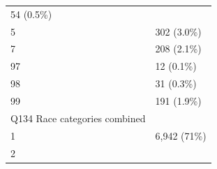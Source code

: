 \documentclass[]{article}
\begin{document}
\begin{longtable}[]{@{}ll@{}}
\begin{minipage}[t]{0.23\columnwidth}
54 (0.5\%)\strut
\end{minipage}\tabularnewline
\begin{minipage}[t]{0.71\columnwidth}\raggedright
5\strut
\end{minipage} & \begin{minipage}[t]{0.23\columnwidth}\raggedright
302 (3.0\%)\strut
\end{minipage}\tabularnewline
\begin{minipage}[t]{0.71\columnwidth}\raggedright
7\strut
\end{minipage} & \begin{minipage}[t]{0.23\columnwidth}\raggedright
208 (2.1\%)\strut
\end{minipage}\tabularnewline
\begin{minipage}[t]{0.71\columnwidth}\raggedright
97\strut
\end{minipage} & \begin{minipage}[t]{0.23\columnwidth}\raggedright
12 (0.1\%)\strut
\end{minipage}\tabularnewline
\begin{minipage}[t]{0.71\columnwidth}\raggedright
98\strut
\end{minipage} & \begin{minipage}[t]{0.23\columnwidth}\raggedright
31 (0.3\%)\strut
\end{minipage}\tabularnewline
\begin{minipage}[t]{0.71\columnwidth}\raggedright
99\strut
\end{minipage} & \begin{minipage}[t]{0.23\columnwidth}\raggedright
191 (1.9\%)\strut
\end{minipage}\tabularnewline
\begin{minipage}[t]{0.71\columnwidth}\raggedright
Q134 Race categories combined\strut
\end{minipage} & \begin{minipage}[t]{0.23\columnwidth}\raggedright
\strut
\end{minipage}\tabularnewline
\begin{minipage}[t]{0.71\columnwidth}\raggedright
1\strut
\end{minipage} & \begin{minipage}[t]{0.23\columnwidth}\raggedright
6,942 (71\%)\strut
\end{minipage}\tabularnewline
\begin{minipage}[t]{0.71\columnwidth}\raggedright
2\strut
\end{minipage} & \begin{minipage}[t]{0.23\columnwidth}\raggedright

\end{minipage}
\end{longtable}
\end{document}
